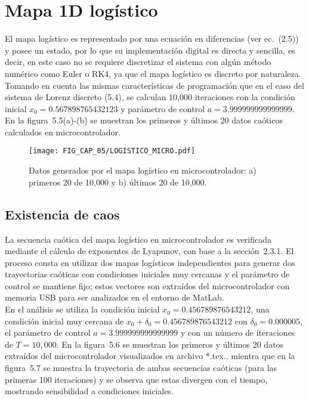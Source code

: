 \section{Mapa 1D logístico}
El mapa logístico es representado por una ecuación en diferencias (ver ec.~(2.5)) y posee un estado, por lo que su implementación digital es directa y sencilla, es decir, en este caso no se requiere discretizar el sistema con algún método numérico como Euler o RK4, ya que el mapa logístico es discreto por naturaleza. Tomando en cuenta las mismas características de programación que en el caso del sistema de Lorenz discreto (5.4), se calculan 10,000 iteraciones con la condición inicial $x_{0}=0.567898765432123$ y parámetro de control $a=3.999999999999999$. En la figura~5.5(a)-(b) se muestran los primeros y últimos 20 datos caóticos calculados en microcontrolador.   

\begin{figure}[!htbp] %
	\center
	\texttt{[image: FIG\_CAP\_05/LOGISTICO\_MICRO.pdf]}   
	\caption{Datos generados por el mapa logístico en microcontrolador: a) primeros 20 de 10,000 y b) últimos 20 de 10,000.}
\end{figure}

\subsection{Existencia de caos}
La secuencia caótica del mapa logístico en microcontrolador es verificada mediante el cálculo de exponentes de Lyapunov, con base a la sección~2.3.1. El proceso consta en utilizar dos mapas logísticos independientes para generar dos trayectorias caóticas con condiciones iniciales muy cercanas y el parámetro de control se mantiene fijo; estos vectores son extraídos del microcontrolador con memoria USB para ser analizados en el entorno de MatLab. \\

En el análisis se utiliza la condición inicial $x_{0}=0.456789876543212$, una condición inicial muy cercana de $x_{0}+\delta_{0}=0.456789876543212$ con $\delta_{0}=0.000005$, el parámetro de control $a=3.999999999999999$ y con un número de iteraciones de $T=10,000$. En la figura~5.6 se muestran los primeros y últimos 20 datos extraídos del microcontrolador visualizados en archivo *.tex., mientra que en la figura~5.7 se muestra la trayectoria de ambas secuencias caóticas (para las primeras 100 iteraciones) y se observa que estas divergen con el tiempo, mostrando sensibilidad a condiciones iniciales. \\

